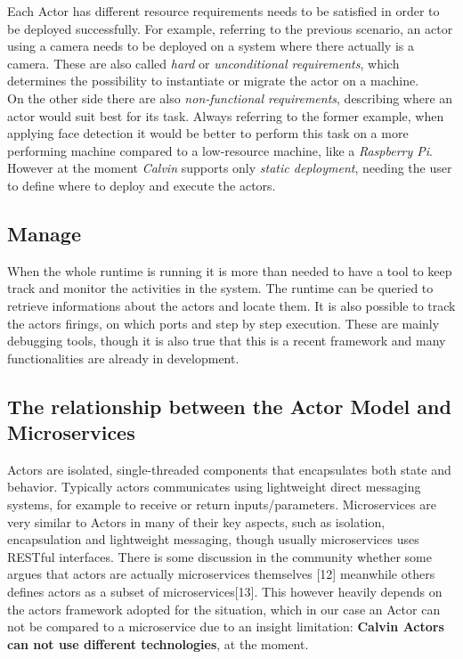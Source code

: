  Each Actor has different resource requirements needs to be satisfied in order to be
  deployed successfully. For example, referring to the previous scenario, an actor
  using a camera needs to be deployed on a system where there actually is a camera. These
  are also called \textit{hard} or \textit{unconditional requirements}, which determines
  the possibility to instantiate or migrate the actor on a machine. \\
  On the other side there are also \textit{non-functional requirements}, describing where
  an actor would suit best for its task. Always referring to the former example, when applying
  face detection it would be better to perform this task on a more performing machine compared to
  a low-resource machine, like a \textit{Raspberry Pi}.\\
  However at the moment \textit{Calvin} supports only \textit{static deployment}, needing the user
  to define where to deploy and execute the actors.

\subsection{Manage}
  When the whole runtime is running it is more than needed to have a tool to keep
  track and monitor the activities in the system. The runtime can be queried to retrieve
  informations about the actors and locate them. It is also possible to track
  the actors firings, on which ports and step by step execution. These are mainly
  debugging tools, though it is also true that this is a recent framework and many
  functionalities are already in development.


\subsection{The relationship between the Actor Model and Microservices}
Actors are isolated, single-threaded components that encapsulates both state and behavior.
Typically actors communicates using lightweight direct messaging systems, for example
to receive or return inputs/parameters. Microservices are very similar to Actors in many
of their key aspects, such as isolation, encapsulation and lightweight messaging, though
usually microservices uses RESTful interfaces. There is some discussion
in the community whether some argues that actors are actually microservices
themselves [12] meanwhile others defines actors as a subset of microservices[13].
This however heavily depends on the actors framework adopted for the situation, which in our
case an Actor can not be compared to a microservice due to an insight limitation: \textbf{Calvin Actors can not
use different technologies}, at the moment.


